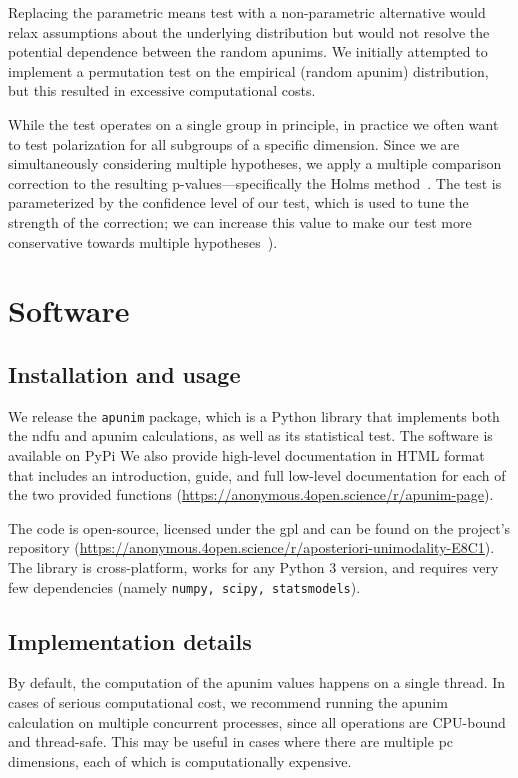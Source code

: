 \documentclass[11pt]{article}
\theoremstyle{definition}
\theoremstyle{plain}
\newcommand{\doclink}{\url{https://anonymous.4open.science/r/apunim-page}}
\newcommand{\explink}{\url{https://anonymous.4open.science/r/aposteriori-unimodality-E8C1}}
\begin{document}
Replacing the parametric means test with a non-parametric alternative would relax assumptions about the underlying distribution but would not resolve the potential dependence between the random apunims. We initially attempted to implement a permutation test on the empirical (random apunim) distribution, but this resulted in excessive computational costs.

While the test operates on a single group in principle, in practice we often want to test polarization for all subgroups of a specific dimension. Since we are simultaneously considering multiple hypotheses, we apply a multiple comparison correction to the resulting p-values---specifically the Holms method~\cite{holms}. The test is parameterized by the confidence level of our test, which is used to tune the strength of the correction; we can increase this value to make our test more conservative towards multiple hypotheses~\cite{ChenFengYi2017}).


\section{Software}
\label{app:software}

\subsection{Installation and usage}
We release the \texttt{apunim} package, which is a Python library that implements both the \ac{ndfu} and apunim calculations, as well as its statistical test. The software is available on PyPi We also provide high-level documentation in HTML format that includes an introduction, guide, and full low-level documentation for each of the two provided functions (\doclink).

The code is open-source, licensed under the \ac{gpl} and can be found on the project's repository (\explink). The library is cross-platform, works for any Python 3 version, and requires very few dependencies (namely \texttt{numpy, scipy, statsmodels}).

\subsection{Implementation details}
By default, the computation of the apunim values happens on a single thread. In cases of serious computational cost, we recommend running the apunim calculation on multiple concurrent processes, since all operations are CPU-bound and thread-safe. This may be useful in cases where there are multiple \ac{pc} dimensions, each of which is computationally expensive. 
\end{document}
